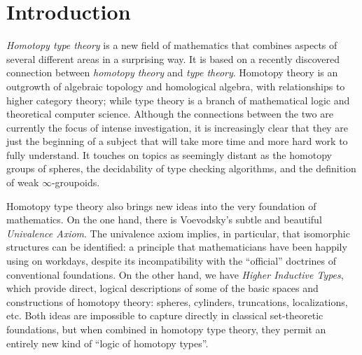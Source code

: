 \chapter*{Introduction} \label{cha:introduction}
\setcounter{page}{1}



%
%
%
%
%
%
%
%

\emph{Homotopy type theory} is a new field of mathematics that combines aspects of several different areas in a surprising way. It is based on a recently discovered connection between \emph{homotopy theory} and \emph{type theory}.
Homotopy theory is an outgrowth of algebraic topology and homological algebra, with relationships to higher category theory; while type theory is a branch of mathematical logic and theoretical computer science.
Although the connections between the two are currently the focus of intense investigation, it is increasingly clear that they are just the beginning of a subject that will take more time and more hard work to fully understand.
It touches on topics as seemingly distant as the homotopy groups of spheres, the decidability of type checking algorithms, and the definition of weak $\infty$-groupoids.

Homotopy type theory also brings new ideas into the very foundation of mathematics.
On the one hand, there is Voevodsky's subtle and beautiful \emph{Univalence Axiom}.
The univalence axiom implies, in particular, that isomorphic structures can be identified: a principle that mathematicians have been happily using on workdays, despite its incompatibility with the ``official'' doctrines of conventional foundations.
On the other hand, we have \emph{Higher Inductive Types}, which provide direct, logical descriptions of some of the basic spaces and constructions of homotopy theory: spheres, cylinders, truncations, localizations, etc.
Both ideas are impossible to capture directly in classical set-theoretic foundations, but when combined in homotopy type theory, they permit an entirely new kind of ``logic of homotopy types''.

